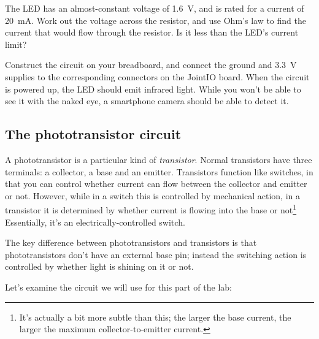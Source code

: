 \documentclass{article}
\begin{document}
The LED has an almost-constant voltage of \SI{1.6}{\volt}, and is rated for a
current of \SI{20}{\milli\ampere}. Work out the voltage across the resistor,
and use Ohm's law to find the current that would flow through the resistor. Is
it less than the LED's current limit?

Construct the circuit on your breadboard, and connect the ground and
\SI{3.3}{\volt} supplies to the corresponding connectors on the JointIO board.
When the circuit is powered up, the LED should emit infrared light. While you
won't be able to see it with the naked eye, a smartphone camera should be able
to detect it.

\subsection{The phototransistor circuit}

A phototransistor is a particular kind of \emph{transistor}. Normal transistors
have three terminals: a collector, a base and an emitter. Transistors function
like switches, in that you can control whether current can flow between the
collector and emitter or not. However, while in a switch this is controlled by
mechanical action, in a transistor it is determined by whether current is
flowing into the base or not\footnote{It's actually a bit more subtle than this;
the larger the base current, the larger the maximum collector-to-emitter
current.} Essentially, it's an electrically-controlled switch.

The key difference between phototransistors and transistors is that
phototransistors don't have an external base pin; instead the switching action
is controlled by whether light is shining on it or not.

Let's examine the circuit we will use for this part of the lab:
\end{document}
